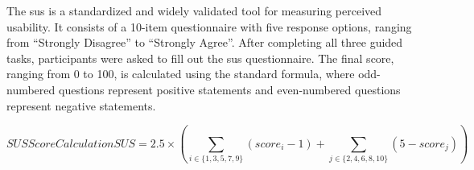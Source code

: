 The \acl{sus} is a standardized and widely validated tool for measuring perceived usability. It consists of a 10-item questionnaire with five response options, ranging from ``Strongly Disagree'' to ``Strongly Agree''. After completing all three guided tasks, participants were asked to fill out the \acs{sus} questionnaire. The final score, ranging from 0 to 100, is calculated using the standard formula, where odd-numbered questions represent positive statements and even-numbered questions represent negative statements.

\begin{equation}[EQ:SUS_SCORE]{SUS Score Calculation}
    SUS = 2.5 \times \left( \sum_{i \in \{1,3,5,7,9\}} (score_i - 1) + \sum_{j \in \{2,4,6,8,10\}} (5 - score_j) \right)
\end{equation}